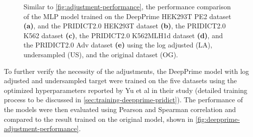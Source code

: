 \begin{figure}
    \centering
    \vspace{-3mm} %
    \vspace{-3mm} %
    \vspace{-3mm} 
    \vspace{-3mm} 
    \vspace{-3mm} 
    \caption[DeepPrime model performance comparison after adjustments]{
        Similar to \autoref{fig:adjustment-performance}, the performance comparison of the MLP model trained on the DeepPrime HEK293T PE2 dataset \textbf{(a)}, and the PRIDICT2.0 HEK293T dataset \textbf{(b)}, the PRIDICT2.0 K562 dataset \textbf{(c)}, the PRIDICT2.0 K562MLH1d dataset \textbf{(d)}, and the PRIDICT2.0 Adv dataset \textbf{(e)} using the log adjusted (LA), undersampled (US), and the original dataset (OG). 
    }
    \label{fig:deepprime-adjustment-performance}
\end{figure}

To further verify the necessity of the adjustments, the DeepPrime model with log adjusted and undersampled target were trained on the five datasets using the optimized hyperparameters reported by Yu et al in their study (detailed training process to be discussed in \autoref{sec:training-deepprime-pridict})\cite{yuPredictionEfficienciesDiverse2023}. The performance of the models were then evaluated using Pearson and Spearman correlation and compared to the result trained on the original model, shown in \autoref{fig:deepprime-adjustment-performance}.

